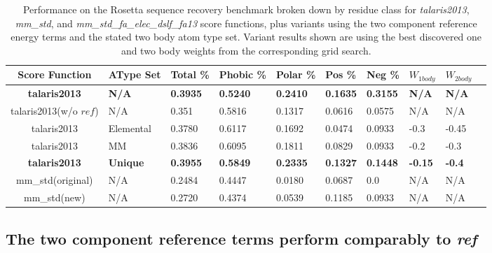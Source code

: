 \begin{table}[!htbp]

\fontsize{9pt}{9pt}
\selectfont

\begin{tabular}{c|lllllllll}
Score Function & AType Set & Total \% & Phobic \% & Polar \% & Pos \% & Neg \% & $W_{1body}$ & $W_{2body}$\\
\hline
\textbf{talaris2013} & \textbf{N/A} & \textbf{0.3935} & \textbf{0.5240} & \textbf{0.2410} & \textbf{0.1635} & \textbf{0.3155} & \textbf{N/A} & \textbf{N/A}\\
talaris2013(w/o $ref$) & N/A & 0.351 & 0.5816 & 0.1317 & 0.0616 & 0.0575 & N/A & N/A\\
talaris2013 & Elemental & 0.3780 & 0.6117 & 0.1692 & 0.0474 & 0.0933 & -0.3 & -0.45\\
talaris2013 & MM & 0.3836 & 0.6095 & 0.1811 & 0.0829 & 0.0933 & -0.2 & -0.3\\
\textbf{talaris2013} & \textbf{Unique} & \textbf{0.3955} & \textbf{0.5849} & \textbf{0.2335} & \textbf{0.1327} & \textbf{0.1448} & \textbf{-0.15} & \textbf{-0.4}\\
\hline
mm\_std(original) & N/A & 0.2484 & 0.4447 & 0.0180 & 0.0687 & 0.0 & N/A & N/A\\
mm\_std(new) & N/A & 0.2720 & 0.4374 & 0.0539 & 0.1185 & 0.0933 & N/A & N/A\\

\end{tabular}

\fontsize{10pt}{11pt}
\selectfont
\caption{Performance on the Rosetta sequence recovery benchmark broken down by residue class for \textit{talaris2013}, \textit{mm\_std}, and \textit{mm\_std\_fa\_elec\_dslf\_fa13} score functions, plus variants using the two component reference energy terms and the stated two body atom type set.
Variant results shown are using the best discovered one and two body weights from the corresponding grid search.}
\label{tab:performance}

\end{table}


\subsection{The two component reference terms perform comparably to \textit{ref}}
